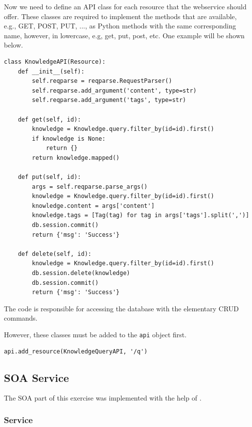 \documentclass[11pt, a4paper]{article}
\begin{document}
Now we need to define an API class for each resource that the webservice should
offer. These classes are required to implement the methods that are available,
e.g., GET, POST, PUT, ..., as Python methods with the same corresponding name,
however, in lowercase, e.g, get, put, post, etc. One example will be shown
below. 

\begin{lstlisting}
class KnowledgeAPI(Resource):
    def __init__(self):
        self.reqparse = reqparse.RequestParser()
        self.reqparse.add_argument('content', type=str)
        self.reqparse.add_argument('tags', type=str)

    def get(self, id):
        knowledge = Knowledge.query.filter_by(id=id).first()
        if knowledge is None:
            return {}
        return knowledge.mapped()

    def put(self, id):
        args = self.reqparse.parse_args()
        knowledge = Knowledge.query.filter_by(id=id).first()
        knowledge.content = args['content']
        knowledge.tags = [Tag(tag) for tag in args['tags'].split(',')]
        db.session.commit()
        return {'msg': 'Success'}

    def delete(self, id):
        knowledge = Knowledge.query.filter_by(id=id).first()
        db.session.delete(knowledge)
        db.session.commit()
        return {'msg': 'Success'}
\end{lstlisting}

\vspace{10pt}

The code is responsible for accessing the database with the elementary CRUD
commands. 

However, these classes must be added to the \lstinline|api| object first. 

\begin{lstlisting}
api.add_resource(KnowledgeQueryAPI, '/q')
\end{lstlisting}

\subsection{SOA Service}

The SOA part of this exercise was implemented with the help of \cite{jax-ws-example}.

\subsubsection{Service}
\end{document}
